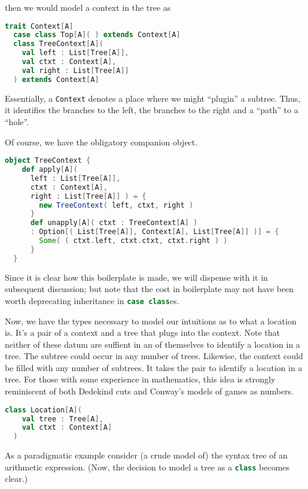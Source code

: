 then we would model a context in the tree as

\begin{lstlisting}[language=Scala,mathescape=true]
  trait Context[A]
  case class Top[A]( ) extends Context[A]
  class TreeContext[A](
    val left : List[Tree[A]],
    val ctxt : Context[A],
    val right : List[Tree[A]]
  ) extends Context[A]
\end{lstlisting}

Essentially, a \lstinline[language=Scala,mathescape=true]!Context!
denotes a place where we might ``plugin'' a subtree. Thus, it
identifies the branches to the left, the branches to the right and a
``path'' to a ``hole''.

Of course, we have the obligatory companion object.

\begin{lstlisting}[language=Scala,mathescape=true]
  object TreeContext {
    def apply[A](
      left : List[Tree[A]],
      ctxt : Context[A],
      right : List[Tree[A]] ) = {
        new TreeContext( left, ctxt, right )
      }
      def unapply[A]( ctxt : TreeContext[A] )
      : Option[( List[Tree[A]], Context[A], List[Tree[A]] )] = {
        Some( ( ctxt.left, ctxt.ctxt, ctxt.right ) )
      }
  }
\end{lstlisting}

Since it is clear how this boilerplate is made, we will dispense with
it in subsequent discussion; but note that the cost in boilerplate may
not have been worth deprecating inheritance in
\lstinline[language=Scala,mathescape=true]!case class!es.

Now, we have the types necessary to model our intuitions as to what a
location is. It's a pair of a context and a tree that plugs into the
context. Note that neither of these datum are suffient in an of
themselves to identify a location in a tree. The subtree could occur
in any number of trees. Likewise, the context could be filled with any
number of subtrees. It takes the pair to identify a location in a
tree. For those with some experience in mathematics, this idea is
strongly reminiscent of both Dedekind cuts and Conway's models of
games as numbers.

\begin{lstlisting}[language=Scala,mathescape=true]
  class Location[A](
    val tree : Tree[A],
    val ctxt : Context[A]
  )  
\end{lstlisting}

As a paradigmatic example consider (a crude model of) the syntax tree
of an arithmetic expression. (Now, the decision to model a tree as a
\lstinline[language=Scala,mathescape=true]!class! becomes clear.)

